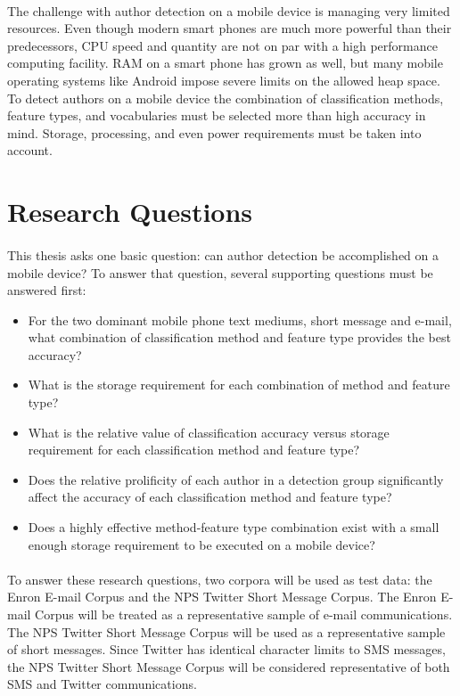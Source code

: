 \paragraph*{} The challenge with author detection on a mobile device is managing very limited resources.  Even though modern smart phones are much more powerful than their predecessors, CPU speed and quantity are not on par with a high performance computing facility.  RAM on a smart phone has grown as well, but many mobile operating systems like Android impose severe limits on the allowed heap space.  To detect authors on a mobile device the combination of classification methods, feature types, and vocabularies must be selected more than high accuracy in mind. Storage, processing, and even power requirements must be taken into account.  

\section{Research Questions}
\paragraph*{} This thesis asks one basic question: can author detection be accomplished on a mobile device?  To answer that question, several supporting questions must be answered first: 
\begin{itemize}
	\item For the two dominant mobile phone text mediums, short message and e-mail, what combination of classification method and feature type provides the best accuracy?
	\item What is the storage requirement for each combination of method and feature type?
	\item What is the relative value of classification accuracy versus storage requirement for each classification method and feature type?
	\item Does the relative prolificity of each author in a detection group significantly affect the accuracy of each classification method and feature type?
	\item Does a highly effective method-feature type combination exist with a small enough storage requirement to be executed on a mobile device?
\end{itemize}

\paragraph*{} To answer these research questions, two corpora will be used as test data: the Enron E-mail Corpus and the NPS Twitter Short Message Corpus.  The Enron E-mail Corpus will be treated as a representative sample of e-mail communications.  The NPS Twitter Short Message Corpus will be used as a representative sample of short messages.  Since Twitter has identical character limits to SMS messages, the NPS Twitter Short Message Corpus will be considered representative of both SMS and Twitter communications.

